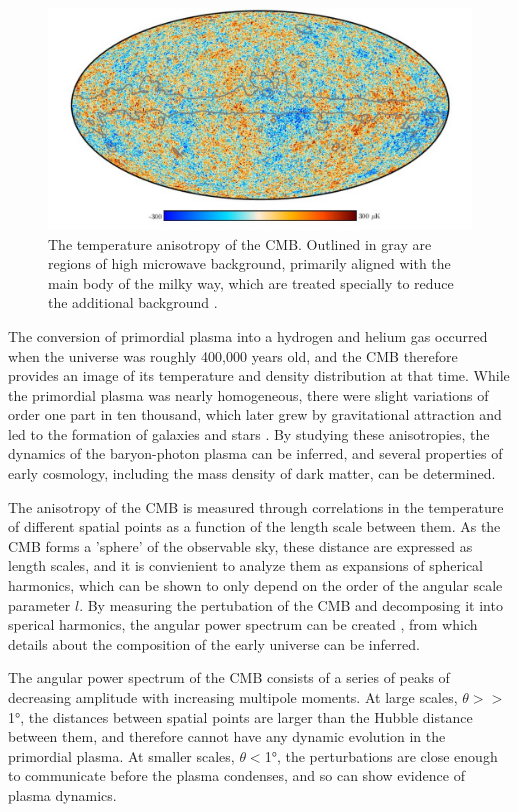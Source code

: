 \begin{figure}[htpb]
	\label{fig:CMB}
	\centering
	\includegraphics[width=1.1\textwidth]{figures/cmb.png}
	\caption[The CMB temperature anisotropy]{The temperature anisotropy of the CMB. Outlined in gray are regions of high microwave background, primarily aligned with the main body of the milky way, which are treated specially to reduce the additional background \cite{PlanckCMB}.}
\end{figure}

The conversion of primordial plasma into a hydrogen and helium gas occurred when the universe was roughly 400,000 years old, and the CMB therefore provides an image of its temperature and density distribution at that time.
While the primordial plasma was nearly homogeneous, there were slight variations of order one part in ten thousand, which later grew by gravitational attraction and led to the formation of galaxies and stars \cite{kurkisuonio}.
By studying these anisotropies, the dynamics of the baryon-photon plasma can be inferred, and several properties of early cosmology, including the mass density of dark matter, can be determined.

The anisotropy of the CMB is measured through correlations in the temperature of different spatial points as a function of the length scale between them. 
As the CMB forms a 'sphere' of the observable sky, these distance are expressed as length scales, and it is convienient to analyze them as expansions of spherical harmonics, which can be shown to only depend on the order of the angular scale parameter $l$. 
By measuring the pertubation of the CMB and decomposing it into sperical harmonics, the angular power spectrum can be created , from which details about the composition of the early universe can be inferred.

The angular power spectrum of the CMB consists of a series of peaks of decreasing amplitude with increasing multipole moments. 
At large scales, $\theta >> $\ang{1}, the distances between spatial points are larger than the Hubble distance between them, and therefore cannot have any dynamic evolution in the primordial plasma.
At smaller scales, $\theta < $\ang{1}, the perturbations are close enough to communicate before the plasma condenses, and so can show evidence of plasma dynamics.

